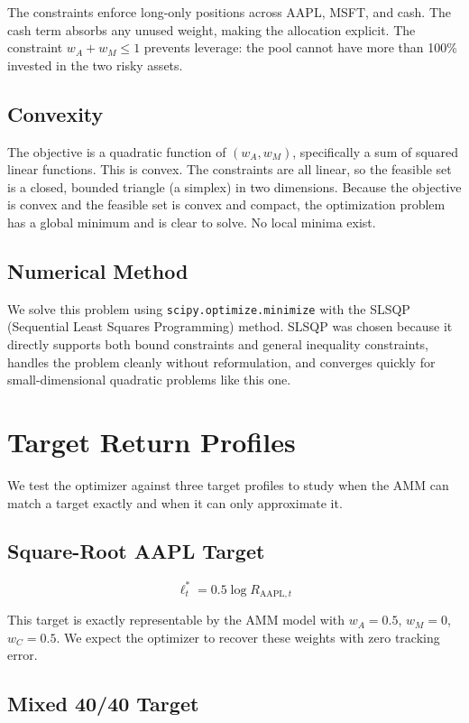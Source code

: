 \documentclass[12pt]{article}
\begin{document}
The constraints enforce long-only positions across AAPL, MSFT, and cash. The cash term absorbs any unused weight, making the allocation explicit. The constraint $w_A + w_M \leq 1$ prevents leverage: the pool cannot have more than 100\% invested in the two risky assets.

\subsection*{Convexity}

The objective is a quadratic function of $(w_A, w_M)$, specifically a sum of squared linear functions. This is convex. The constraints are all linear, so the feasible set is a closed, bounded triangle (a simplex) in two dimensions. Because the objective is convex and the feasible set is convex and compact, the optimization problem has a global minimum and is clear to solve. No local minima exist.

\subsection*{Numerical Method}

We solve this problem using \texttt{scipy.optimize.minimize} with the SLSQP (Sequential Least Squares Programming) method. SLSQP was chosen because it directly supports both bound constraints and general inequality constraints, handles the problem cleanly without reformulation, and converges quickly for small-dimensional quadratic problems like this one.

\section{Target Return Profiles}

We test the optimizer against three target profiles to study when the AMM can match a target exactly and when it can only approximate it.

\subsection*{Square-Root AAPL Target}

\[
\ell_t^* = 0.5 \log R_{\text{AAPL},t}
\]

This target is exactly representable by the AMM model with $w_A = 0.5$, $w_M = 0$, $w_C = 0.5$. We expect the optimizer to recover these weights with zero tracking error.

\subsection*{Mixed 40/40 Target}
\end{document}
